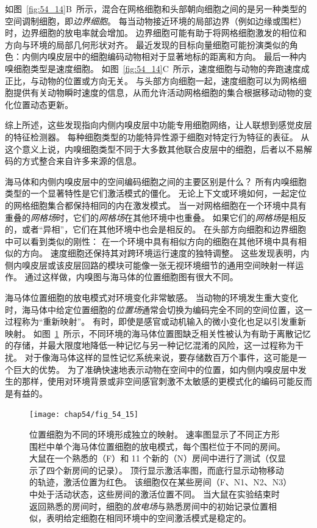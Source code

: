 如图~\ref{fig:54_14}B~所示，混合在网格细胞和头部朝向细胞之间的是另一种类型的空间调制细胞，即\textit{边界细胞}。
每当动物接近环境的局部边界（例如边缘或围栏）时，边界细胞的放电率就会增加。
边界细胞可能有助于将网格细胞激发的相位和方向与环境的局部几何形状对齐。
最近发现的目标向量细胞可能扮演类似的角色：内侧内嗅皮层中的细胞编码动物相对于显著地标的距离和方向。
最后一种内嗅细胞类型是速度细胞。
如图~\ref{fig:54_14}C~所示，速度细胞与动物的奔跑速度成正比，与动物的位置或方向无关。
与头部方向细胞一起，速度细胞可以为网格细胞提供有关动物瞬时速度的信息，从而允许活动网格细胞的集合根据移动动物的变化位置动态更新。


综上所述，这些发现指向内侧内嗅皮层中功能专用细胞网络，让人联想到感觉皮层的特征检测器。
每种细胞类型的功能特异性源于细胞对特定行为特征的表征。
从这个意义上说，内嗅细胞类型不同于大多数其他联合皮层中的细胞，后者以不易解码的方式整合来自许多来源的信息。


海马体和内侧内嗅皮层中的空间编码细胞之间的主要区别是什么？
所有内嗅细胞类型的一个显著特性是它们激活模式的僵化。
无论上下文或环境如何，一起定位的网格细胞集合都保持相同的内在激发模式。
当一对网格细胞在一个环境中具有重叠的\textit{网格场}时，它们的\textit{网格场}在其他环境中也重叠。
如果它们的\textit{网格场}是相反的，或者“异相”，它们在其他环境中也会是相反的。
在头部方向细胞和边界细胞中可以看到类似的刚性：
在一个环境中具有相似方向的细胞在其他环境中具有相似的方向。
速度细胞还保持其对跨环境运行速度的独特调整。
这些发现表明，内侧内嗅皮层或该皮层回路的模块可能像一张无视环境细节的通用空间映射一样运作。
通过这样做，内嗅图与海马体的位置细胞图有很大不同。


海马体位置细胞的放电模式对环境变化非常敏感。
当动物的环境发生重大变化时，海马体中给定位置细胞的\textit{位置场}通常会切换为编码完全不同的空间位置，这一过程称为“重新映射”。
有时，即使是感官或动机输入的微小变化也足以引发重新映射。
如图~\ref{fig:54_15}~所示，不同环境的海马体位置图缺乏相关性被认为有助于离散记忆的存储，并最大限度地降低一种记忆与另一种记忆混淆的风险，这一过程称为干扰。
对于像海马体这样的显性记忆系统来说，要存储数百万个事件，这可能是一个巨大的优势。
为了准确快速地表示动物在空间中的位置，如内侧内嗅皮层中发生的那样，使用对环境背景或非空间感官刺激不太敏感的更模式化的编码可能反而是有益的。


\begin{figure}[htbp]
	\centering
	\texttt{[image: chap54/fig\_54\_15]}
	\caption{位置细胞为不同的环境形成独立的映射。
		速率图显示了不同正方形围栏中单个海马体位置细胞的放电模式，每个围栏位于不同的房间。
		大鼠在一个熟悉的（F）和 11 个新的（N）房间中进行了测试（仅显示了四个新房间的记录）。
		顶行显示激活率图，而底行显示动物移动的轨迹，激活位置为红色。
		该细胞仅在某些房间（F、N1、N2、N3）中处于活动状态，这些房间的激活位置不同。
		当大鼠在实验结束时返回熟悉的房间时，细胞的\textit{放电场}与熟悉房间中的初始记录位置相似，表明给定细胞在相同环境中的空间激活模式是稳定的\cite{alme2014place}。}
	\label{fig:54_15}
\end{figure}



